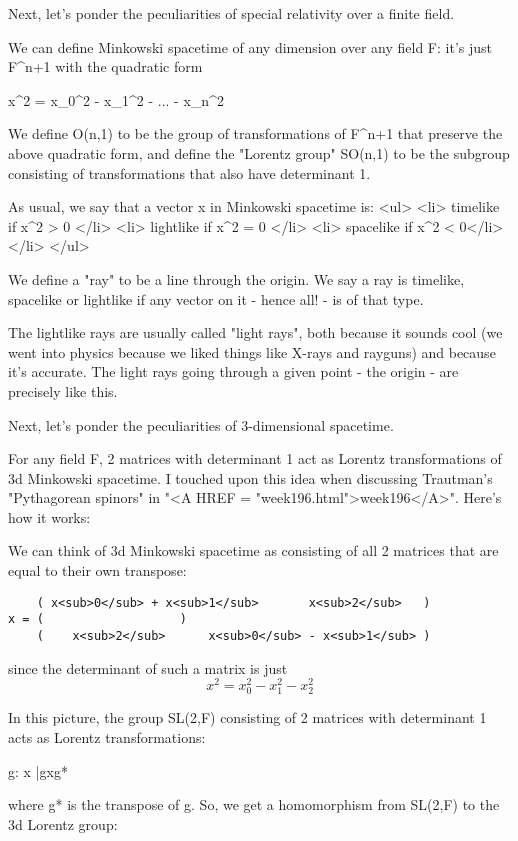 Next, let's ponder the peculiarities of special relativity over a finite field.

We can define Minkowski spacetime of any dimension over any field F: 
it's just F^{n+1} with the quadratic form

x^{2} = x_{0}^{2} - x_{1}^{2} - ... - x_{n}^{2}

We define O(n,1) to be the group of transformations of F^{n+1} that preserve 
the above quadratic form, and define the "Lorentz group" 
SO(n,1) to be
the subgroup consisting of transformations that also have determinant 1.

As usual, we say that a vector x in Minkowski spacetime is:
<ul>
<li>
   timelike if  x^{2} > 0
</li>
<li>
   lightlike if x^{2} = 0
</li>
<li>
   spacelike if x^{2} < 0</li>
</li>
</ul>


We define a "ray" 
to be a line through the origin.  We say a ray is
timelike, spacelike or lightlike if any vector on it - hence all! - 
is of that type.

The lightlike rays are usually called "light rays", 
both because it sounds cool 
(we went into physics because we liked things like X-rays and rayguns) and 
because it's accurate.  The light rays going through a given point - the origin -
are precisely like this.   

Next, let's ponder the peculiarities of 3-dimensional spacetime.

For any field F, 2 matrices with determinant 1 act as Lorentz transformations
of 3d Minkowski spacetime.   I touched upon this idea when discussing Trautman's 
"Pythagorean spinors" 
in 
"<A HREF = "week196.html">week196</A>".   Here's how it works:

We can think of 3d Minkowski spacetime as consisting of all 2 matrices
that are equal to their own transpose:

\begin{verbatim}
    ( x<sub>0</sub> + x<sub>1</sub>       x<sub>2</sub>   )
x = (                   )
    (    x<sub>2</sub>      x<sub>0</sub> - x<sub>1</sub> )
\end{verbatim}
    
since the determinant of such a matrix is just 
$$
x^{2} = x_{0}^{2} - x_{1}^{2} - x_{2}^{2}
$$
    
In this picture, the group SL(2,F) consisting of 2 matrices with determinant 1
acts as Lorentz transformations:

g: x |\to  gxg*

where g* is the transpose of g.   So, we get a homomorphism from SL(2,F)
to the 3d Lorentz group:

